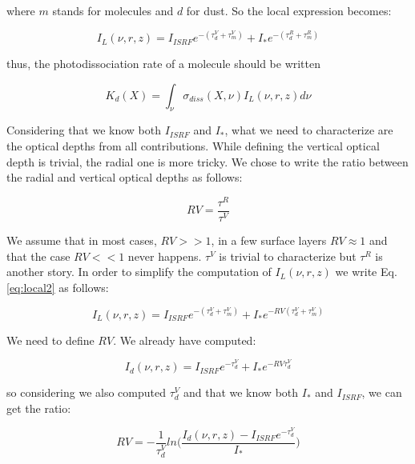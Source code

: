 \documentclass[a4paper]{article}
\begin{document}
\noindent where $m$ stands for molecules and $d$ for dust. So the local expression becomes:

\begin{equation}
\label{eq:local2}%
	I_L(\nu, r, z) =   I_{ISRF}e^{-(\tau^V_d + \tau^V_m)} + I_{*}e^{-(\tau^R_d + \tau^R_m)}
\end{equation}

\noindent thus, the photodissociation rate of a molecule should be written

 \begin{equation}
\label{eq:Kdef2}%
	K_d(X) =  \int_\nu  \sigma_{diss}(X, \nu) I_L(\nu, r, z) d\nu
\end{equation}

\noindent Considering that we know both $I_{ISRF}$ and $I_{*}$, what we need to characterize are the optical depths from all contributions. While defining the vertical optical depth is trivial, the radial one is more tricky. We chose to write the ratio between the radial and vertical optical depths as follows:

 \begin{equation}
\label{eq:RV}%
	RV =  \frac{\tau^R}{\tau^V}
\end{equation}

\noindent We assume that in most cases, $RV >> 1$, in a few surface layers $RV \approx 1$ and that the case $RV << 1$ never happens. 
\noindent $\tau^V$ is trivial to characterize but $\tau^R$ is another story. In order to simplify the computation of $I_L(\nu, r, z)$ we write Eq. \ref{eq:local2} as follows:

\begin{equation}
\label{eq:local3}%
	I_L(\nu, r, z) =   I_{ISRF}e^{-(\tau^V_d + \tau^V_m)} + I_{*}e^{-RV(\tau^V_d + \tau^V_m)}
\end{equation}

\noindent We need to define $RV$. We already have computed:


\begin{equation}
\label{eq:local_d}%
	I_d(\nu, r, z) =   I_{ISRF}e^{-\tau^V_d} + I_{*}e^{-RV\tau^V_d}
\end{equation}

\noindent so considering we also computed $\tau^V_d$ and that we know both $I_{*}$ and $I_{ISRF}$, we can get the ratio:


\begin{equation}
\label{eq:ratio}%
	RV =   -\frac{1}{\tau_d^V}ln\bigg(\frac{I_d(\nu, r, z) - I_{ISRF}e^{-\tau^V_d}}{I_*}\bigg)
\end{equation}
\end{document}
